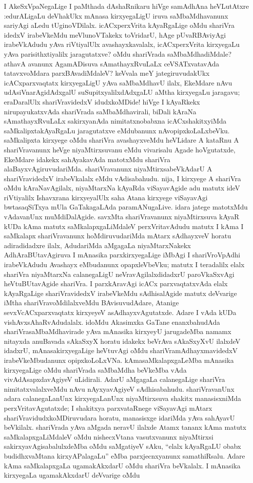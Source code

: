I AkeSxVpaNegaLige I paMthada dAshaRnikaru hiVge samAdhAna heVLutAtxre :\break edurALi\-gaLu deVhakUkx mAnasa kirxyegaLigU iruva saMbaMdhavanunx sariyAgi aLedu tUginoVDilalx. icACxperxVrita kAyaRgaLige oMdu shariVra idedxV irabeVkeMdu meVlu\-noVTakekx toVridarU, hAge pUvaRBAviyAgi irabeVkAdudu yAva riVtiyalUlx avashayxkavalalx, icACxperxVrita kirxyegaLu yAva parisithxtiyalilx jaragutatxve? oMdu shariVrada saMbaMdhadiMdale? athavA avanunx AgamADisuva sAmathayxRvuLaLx ceVSATxvatavAda tatavxvoMdara parxBAvadiMdaleV? keVvala meY jategiruvudakUkx icACxparxvaqtatx kirxyegaLigU yAva saMbaMdhavU ilalx, EkeMdare nAvu udAsiVnarAgidAdxgalU suSupitxyalilx\-dAdxgaLU aMtha kirxyegaLu jaragavu; eraDaralUlx shariVravidedxV idudxkoMDide! hiVge I kAyaRkekx nirupayukatxvAda shariVrada saMbaMdhavirali, biDali kAraNa sAmathayxRvuLaLx sakirxyanAda nimitatxnobabxna icACxshakitxyiMda saMkalipxtakAyaRgaLu jaragutatxve eMdubanunx nAvopipxkoLaLxbeVku. saMkalipxta kirxyege oMdu shariVra avashayxveMdu heVLidare A kataRnu A shariVravanunx heVge niyaMtirxsuvanu eMdu vivarisalu Agade hoVgutatxde, EkeMdare idakekx sahAyakavAda matotxMdu shariVra alaBayxvAgiruvudariMda. shariVravanunx niyaMtirxsabeVkAdarU A shariVravidedxV irabeVkalalx eMdu vAdisabahudu. nija, I kirxyege A shariVra oMdu kAraNavAgilalx, niyaMtarxNa kAyaRda viSayavAgide adu matutx ideV riVtiyalilx Ishavxrana kirxyeyalUlx saha Atana kirxyege viSayavAgi bwtasaqSiTxya mUla GaTakagaLAda paramANugaLive. idara jatege matotxMdu vAdavanUnx muMdiDalAgide. savxMta shariVravanunx niyaMtirxsuva kAyaR kUDa kAma matutx saMkalapxgaLiMdaleV perxVritavAdudu matutx I kAma I saMkalapx shariVravanunx hoMdiruvudariMda mAtarx sAdhayxveV horatu adiradidadxre ilalx, AdudariMda aMgagaLa niyaMtarxNakekx AdhAraBUtavAgiruva I mAnasika parxkirxyegaLige iMbAgi I shariVroVpAdhi irabeVkAdudu Avashayx eMbudanunx opapxleVbeVku; matutx I teradalilx elalx shariVra niyaMtarxNa calanegaLigU neVravAgilalxdidadxrU paroVkaSxvAgi heVtuBUtavAgide shariVra. I parxkAravAgi icACx parxvaqtatxvAda elalx kAyaRgaLige shariVravidedxV irabeVkeMdu sAdhisalAgide matutx deVvarige iMtha shariVravoMdilalxveMdu BAvisuvudAdare, Atanige sevxVcACxparxvaqtatx kirxyeyeV asAdhayxvAgutatxde. Adare I vAda kUDa vishAvxsAhaRvAdudalalx. idoMdu Akasimxka GaTane enanxbahudAda shariVrasaMbaMdhavirade yAva mAnasika kirxyeyU jarugadeMba namamx nitayxda anuBavada sAkaSxyX horatu idakekx beVrAva sAkaSxyXvU ilalxdeV idadxrU, mAnasakirxyegaLige heVtuvAgi oMdu shariVramAdhayxmavidedxV  irabeVkeMbudanunx opipxkoLoLxVNa. kAmasaMkalapxgaLeMba mAnasika kirxyegaLige oMdu shariVrada saMbaMdha beVkeMba vAda vivAdAsapxdavAgiyeV uLidirali. AdarU aMgagaLa calanegaLige shariVra nimitatxvalalxveMdu nAvu nAyxyavAgiyeV sAdhisabahudu. shariVravanUnx adara calanegaLanUnx kirxyegaLanUnx niyaMtirxsuva shakitx manasisxniMda perxVritavAgutatxde; I shakitxya parxvataRnege viSayavAgi mAtarx shariVravidudxkoMDiruvudara horatu, manasisxge idariMda yAva sahAyavU beVkilalx. shariVrada yAva aMgada neravU ilalxde Atamx tananx kAma matutx saMkalapxgaLiMdaleV oMdu nishecxVtana vasutxvanunx niyaMtirxsi sakirxyavAgisabalulxdeMba oMdu saMgatiyeV sAku, ``elalx kAyaRgaLU obabx budidhxvaMtana kirxyAPalagaLu'' eMba parxjecnxyanunx samathiRsalu. Adare kAma saMkalapxgaLa ugamakAkxdarU oMdu shariVra beVkalalx. I mAnasika kirxyegaLa ugamakAkxdarU deVvarige oMdu 